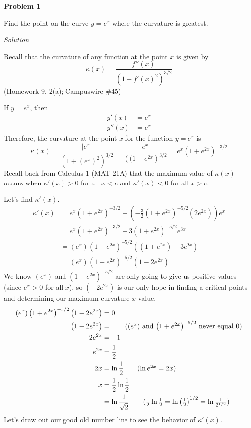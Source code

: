 \documentclass{article}
\newcommand{\lrp}[1]{\left( #1 \right)}
\newcommand{\Solution}{\textit{Solution}}
\begin{document}
{}\textbf{Problem 1}

Find the point on the curve $y=e^x$ where the curvature is greatest.

\Solution

Recall that the curvature of any function at the point $x$ is given by \begin{equation*}
    \kappa (x)=\frac{\left|f''(x)\right|}{(1+f'(x)^2)^{3/2}}
\end{equation*}
(Homework 9, 2(a); Campuswire \#45)

If $y=e^x$, then
\begin{align*}
    y'(x)&=e^x\\
    y''(x)&=e^{x}
\end{align*}
Therefore, the curvature at the point $x$ for the function $y=e^x$ is
\begin{equation*}
    \kappa(x)=\frac{\left|e^x\right|}{\lrp{1+\lrp{e^x}^2}^{3/2}}=\frac{e^x}{\lrp{(1+e^{2x}}^{3/2}}=e^x\lrp{1+e^{2x}}^{-3/2}\tag{$e^x>0$ for all $x$}
\end{equation*}
Recall back from Calculus 1 (MAT 21A) that the maximum value of $\kappa(x)$ occurs when $\kappa'(x)>0$ for all $x<c$ and $\kappa'(x)<0$ for all $x>c$.

Let's find $\kappa'(x)$.
\begin{align*}
    \kappa'(x)&=e^x\lrp{1+e^{2x}}^{-3/2}+\lrp{-\frac{3}{2}\lrp{1+e^{2x}}^{-5/2}\lrp{2e^{2x}}}e^x\\
    &=e^x\lrp{1+e^{2x}}^{-3/2}-3\lrp{1+e^{2x}}^{-5/2}e^{3x}\\
    &=\lrp{e^x}\lrp{1+e^{2x}}^{-5/2}\lrp{\lrp{1+e^{2x}}-3e^{2x}}\tag{factor}\\
    &=\lrp{e^x}\lrp{1+e^{2x}}^{-5/2}\lrp{1-2e^{2x}}
\end{align*}
We know $(e^x)$ and $\displaystyle \lrp{1+e^{2x}}^{-5/2}$ are only going to give us positive values (since $e^x>0$ for all $x$), so $\lrp{-2e^{2x}}$ is our only hope in finding a critical points and determining our maximum curvature $x$-value.
\begin{align*}
    \lrp{e^x}\lrp{1+e^{2x}}^{-5/2}\lrp{1-2e^{2x}}&=0\\
    \lrp{1-2e^{2x}}&=\tag{$(e^x)$ and $\lrp{1+e^{2x}}^{-5/2}$ never equal $0$}\\
    -2e^{2x}&=-1\\
    e^{2x}&=\frac{1}{2}\\
    2x&=\ln\frac{1}{2}\tag{$\ln e^{2x}=2x$}\\
    x&=\frac{1}{2}\ln\frac{1}{2}\\
    &=\ln \frac{1}{\sqrt{2}}\tag{$\frac{1}{2}\ln\frac{1}{2}=\ln \lrp{\frac{1}{2}}^{1/2}=\ln \frac{1}{2^{1/2}}$}
\end{align*}
Let's draw out our good old number line to see the behavior of $\kappa'(x)$.
\end{document}
